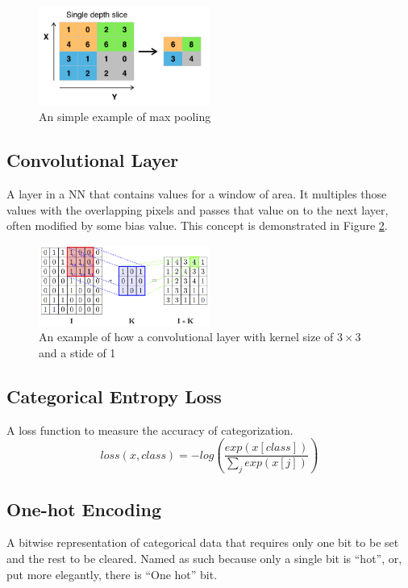 \documentclass[10pt,Times New Roman]{article}
\begin{document}
        \begin{figure}[h] 
            \centering \includegraphics[width=0.5\textwidth]{max_pooling_example}
            \caption{An simple example of max pooling}\label{fig:maxpool}
        \end{figure}

    \subsection{Convolutional Layer}
        A layer in a NN that contains values for a window of area. It multiples those values
        with the overlapping pixels and passes that value on to the next layer, often modified
        by some bias value. This concept is demonstrated in Figure \ref{fig:convlayer}.

        \begin{figure}[h]
            \centering \includegraphics[width=0.5\textwidth]{convolutional_layer_example}
            \caption{An example of how a convolutional layer with kernel size of $3\times3$ and a
                     stide of 1}\label{fig:convlayer}
        \end{figure}

    \subsection{Categorical Entropy Loss}\label{def:catentropyloss}
        A loss function to measure the accuracy of categorization.
        \[loss(x, class) = -log\left(\frac{exp(x[class])}{\sum_j exp(x[j])}\right)\]

    \subsection{One-hot Encoding}
        A bitwise representation of categorical data that requires only one bit to be set and 
        the rest to be cleared. Named as such because only a single bit is ``hot'', or, put more 
        elegantly, there is ``One hot'' bit.
\end{document}
